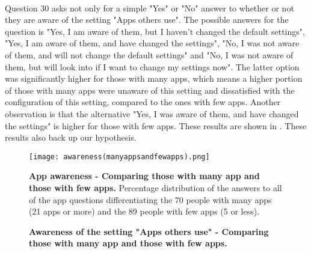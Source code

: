 \paragraph{}
Question 30 asks not only for a simple "Yes" or "No" answer to whether or not they are aware of the setting "Apps others use". The possible answers for the question is "Yes, I am aware of them, but I haven't changed the default settings", "Yes, I am aware of them, and have changed the settings", "No, I was not aware of them, and will not change the default settings" and "No, I was not aware of them, but will look into if I want to change my settings now". The latter option was significantly higher for those with many apps, which means a higher portion of those with many apps were unaware of this setting and dissatisfied with the configuration of this setting, compared to the ones with few apps. Another observation is that the alternative "Yes, I was aware of them, and have changed the settings" is higher for those with few apps. These results are shown in . These results also back up our hypothesis. 

\begin{figure}[h!]
\centering
\texttt{[image: awareness(manyappsandfewapps).png]}
\caption[App awareness - Comparing those with many app and those with few apps]{\textbf{App awareness - Comparing those with many app and those with few apps.} Percentage distribution of the answers to all of the app questions differentiating the 70 people with many apps (21 apps or more) and the 89 people with few apps (5 or less).} 
\label{fig:manyappsandfewapps}
\end{figure}

\begin{figure}[h!]
\centering
{}
\caption[Awareness of the setting "Apps others use" - Comparing those with many app and those with few apps]{\textbf{Awareness of the setting "Apps others use" - Comparing those with many app and those with few apps.}} 
\label{fig:appsothersusemanyfew}
\end{figure}



